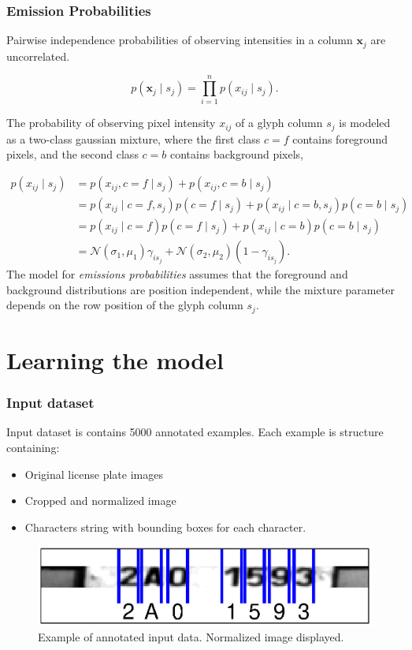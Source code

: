 \documentclass{beamer}
\begin{document}
\begin{frame}
  \frametitle{Emission Probabilities}

\item[Pairwise independence] probabilities of observing intensities in
  a column $\mathbf{x}_j$ are uncorrelated.

  \[p(\mathbf{x}_j \mid s_j) = \prod_{i=1}^np(x_{ij} \mid s_j).\] 

The probability of observing
  pixel intensity $x_{ij}$ of a glyph column $s_j$ is modeled as a
  two-class gaussian mixture, where the first class $c=f$ contains
  foreground pixels, and the second class $c=b$ contains background
  pixels,

\begin{align*}
  p(x_{ij} \mid s_j) &= p(x_{ij},c=f \mid s_j)+p(x_{ij},c=b \mid s_j)\\
  &= p(x_{ij}\mid c=f,s_j)p(c=f \mid s_j)+p(x_{ij} \mid c=b,s_j)p(c=b \mid s_j) \\
  &= p(x_{ij}\mid c=f)p(c=f \mid s_j)+p(x_{ij} \mid c=b)p(c=b \mid s_j) \\
  &= \mathcal{N}(\sigma_1,\mu_1)\gamma_{is_j}+\mathcal{N}(\sigma_2,\mu_2)(1-\gamma_{is_j}).
\end{align*}
The model for \emph{emissions probabilities} assumes that the
foreground and background distributions are position independent,
while the mixture parameter depends on the row position of the glyph
column $s_j$.

\end{frame}

\section{Learning the model}

\begin{frame}
  \frametitle{Input dataset}
  Input dataset is contains 5000 annotated examples. Each example is structure containing:
\begin{itemize}
  \item Original license plate images
  \item Cropped and normalized image
  \item Characters string with bounding boxes for each character.
\end{itemize}

\begin{figure}
\includegraphics[width=\linewidth]{pics/input_example.eps}
\caption{Example of annotated input data. Normalized image displayed.}
\label{fig:distribution}
\end{figure}

\end{frame}
\end{document}
